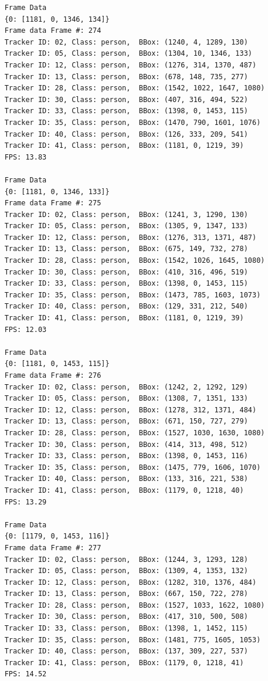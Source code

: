 \documentclass{fisatprojectfinal}
\begin{document}
\begin{verbatim}
    Frame Data
    {0: [1181, 0, 1346, 134]}
    Frame data Frame #: 274
    Tracker ID: 02, Class: person,  BBox: (1240, 4, 1289, 130)
    Tracker ID: 05, Class: person,  BBox: (1304, 10, 1346, 133)
    Tracker ID: 12, Class: person,  BBox: (1276, 314, 1370, 487)
    Tracker ID: 13, Class: person,  BBox: (678, 148, 735, 277)
    Tracker ID: 28, Class: person,  BBox: (1542, 1022, 1647, 1080)
    Tracker ID: 30, Class: person,  BBox: (407, 316, 494, 522)
    Tracker ID: 33, Class: person,  BBox: (1398, 0, 1453, 115)
    Tracker ID: 35, Class: person,  BBox: (1470, 790, 1601, 1076)
    Tracker ID: 40, Class: person,  BBox: (126, 333, 209, 541)
    Tracker ID: 41, Class: person,  BBox: (1181, 0, 1219, 39)
    FPS: 13.83
    
    Frame Data
    {0: [1181, 0, 1346, 133]}
    Frame data Frame #: 275
    Tracker ID: 02, Class: person,  BBox: (1241, 3, 1290, 130)
    Tracker ID: 05, Class: person,  BBox: (1305, 9, 1347, 133)
    Tracker ID: 12, Class: person,  BBox: (1276, 313, 1371, 487)
    Tracker ID: 13, Class: person,  BBox: (675, 149, 732, 278)
    Tracker ID: 28, Class: person,  BBox: (1542, 1026, 1645, 1080)
    Tracker ID: 30, Class: person,  BBox: (410, 316, 496, 519)
    Tracker ID: 33, Class: person,  BBox: (1398, 0, 1453, 115)
    Tracker ID: 35, Class: person,  BBox: (1473, 785, 1603, 1073)
    Tracker ID: 40, Class: person,  BBox: (129, 331, 212, 540)
    Tracker ID: 41, Class: person,  BBox: (1181, 0, 1219, 39)
    FPS: 12.03
    
    Frame Data
    {0: [1181, 0, 1453, 115]}
    Frame data Frame #: 276
    Tracker ID: 02, Class: person,  BBox: (1242, 2, 1292, 129)
    Tracker ID: 05, Class: person,  BBox: (1308, 7, 1351, 133)
    Tracker ID: 12, Class: person,  BBox: (1278, 312, 1371, 484)
    Tracker ID: 13, Class: person,  BBox: (671, 150, 727, 279)
    Tracker ID: 28, Class: person,  BBox: (1527, 1030, 1630, 1080)
    Tracker ID: 30, Class: person,  BBox: (414, 313, 498, 512)
    Tracker ID: 33, Class: person,  BBox: (1398, 0, 1453, 116)
    Tracker ID: 35, Class: person,  BBox: (1475, 779, 1606, 1070)
    Tracker ID: 40, Class: person,  BBox: (133, 316, 221, 538)
    Tracker ID: 41, Class: person,  BBox: (1179, 0, 1218, 40)
    FPS: 13.29
    
    Frame Data
    {0: [1179, 0, 1453, 116]}
    Frame data Frame #: 277
    Tracker ID: 02, Class: person,  BBox: (1244, 3, 1293, 128)
    Tracker ID: 05, Class: person,  BBox: (1309, 4, 1353, 132)
    Tracker ID: 12, Class: person,  BBox: (1282, 310, 1376, 484)
    Tracker ID: 13, Class: person,  BBox: (667, 150, 722, 278)
    Tracker ID: 28, Class: person,  BBox: (1527, 1033, 1622, 1080)
    Tracker ID: 30, Class: person,  BBox: (417, 310, 500, 508)
    Tracker ID: 33, Class: person,  BBox: (1398, 1, 1452, 115)
    Tracker ID: 35, Class: person,  BBox: (1481, 775, 1605, 1053)
    Tracker ID: 40, Class: person,  BBox: (137, 309, 227, 537)
    Tracker ID: 41, Class: person,  BBox: (1179, 0, 1218, 41)
    FPS: 14.52
    

\end{verbatim}
\end{document}
